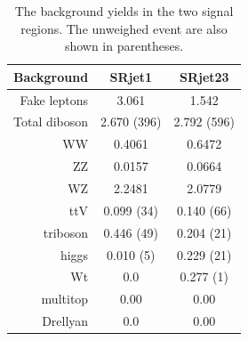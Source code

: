 \begin{table}[htpb]
\centering
\begin{tabular}{|r|c|c|}
\hline
Background & SRjet1 & SRjet23 \\
\hline
\hline
Fake leptons & 3.061 & 1.542\\
\hline
\hline
Total diboson & 2.670 (396) & 2.792 (596)\\
\hline
WW & 0.4061 &  0.6472 \\
ZZ & 0.0157 &  0.0664 \\
WZ & 2.2481 &  2.0779 \\
\hline
\hline
ttV & 0.099 (34) & 0.140 (66)\\
triboson & 0.446 (49)& 0.204 (21)\\
higgs & 0.010 (5)& 0.229 (21)\\
Wt & 0.0 & 0.277 (1)\\
multitop & 0.00 & 0.00 \\
Drellyan & 0.0 & 0.00\\
\hline
\end{tabular}
\caption{The background yields in the two signal regions. The unweighed event are also shown in parentheses.}
\label{tab:SR_yields}
\end{table}

